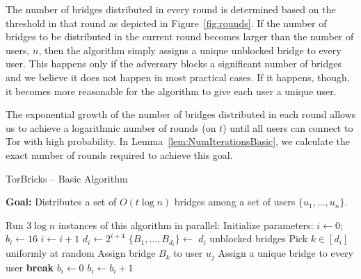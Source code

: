 \documentclass{sig-alternate-05-2015}
\newcommand{\algFont}{\fontsize{10}{13}\selectfont}
\newcommand{\bricks}{}
\def\bricks/{\mbox{TorBricks}}
\begin{document}
The number of bridges distributed in every round is determined based on the threshold in that round as depicted in Figure~\ref{fig:rounds}. If the number of bridges to be distributed in the current round becomes larger than the number of users, $n$, then the algorithm simply assigns a unique unblocked bridge to every user. This happens only if the adversary blocks a significant number of bridges and we believe it does not happen in most practical cases. If it happens, though, it becomes more reasonable for the algorithm to give each user a unique user.

The exponential growth of the number of bridges distributed in each round allows us to achieve a logarithmic number of rounds (on $t$) until all users can connect to Tor with high probability. In Lemma~\ref{lem:NumIterationsBasic}, we calculate the exact number of rounds required to achieve this goal.

\begin{algorithm}[t]
	\caption{\bricks/ -- Basic Algorithm}
	\label{alg:Basic}
	\vspace{0.4em}
	\textbf{Goal:} Distributes a set of $O(t\log{n})$ bridges among a set of users $\{u_1,...,u_n\}$.
	
	\algFont \vspace{2pt}
	\begin{algorithmic}[1]
		\Statex \hspace{-\algorithmicindent} Run $3\log{n}$ instances of this algorithm in parallel:
		\State Initialize parameters: ${i \gets 0}$; ${b_i \gets 16}$  \label{ln:algstart}
		\While{\True}
			 \label{ln:ConditionSimple}
				\State $i \gets i+1$ \label{ln:IncrementSimple}
				\State $d_i \gets 2^{i+4}$
					\State $\{B_1,...,B_{d_i}\} \gets$ $d_i$ unblocked bridges \label{ln:RecruitBridges}						
						\State Pick $k \in [d_i]$ uniformly at random 
						\State Assign bridge $B_{k}$ to user $u_j$				
					\EndFor			
				\Else
					\State Assign a unique bridge to every user
					\State \textbf{break}
				\EndIf
			\EndIf
			\State $b_i \gets 0$
					
					\State $b_i \gets b_i + 1$
				\EndIf
			\EndFor
		\EndWhile	\label{ln:algend}
	\end{algorithmic}	
\end{algorithm}
\end{document}
